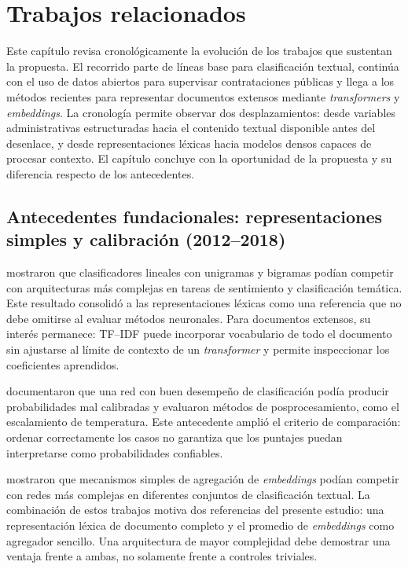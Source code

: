 \clearpage
{}
\chapter{Trabajos relacionados}
\label{sec:trabajos_relacionados}

Este capítulo revisa cronológicamente la evolución de los trabajos que sustentan la propuesta. El recorrido parte de líneas base para clasificación textual, continúa con el uso de datos abiertos para supervisar contrataciones públicas y llega a los métodos recientes para representar documentos extensos mediante \textit{transformers} y \textit{embeddings}. La cronología permite observar dos desplazamientos: desde variables administrativas estructuradas hacia el contenido textual disponible antes del desenlace, y desde representaciones léxicas hacia modelos densos capaces de procesar contexto. El capítulo concluye con la oportunidad de la propuesta y su diferencia respecto de los antecedentes.

\section{Antecedentes fundacionales: representaciones simples y calibración (2012--2018)}

\textcite{wang2012baselines} mostraron que clasificadores lineales con unigramas y bigramas podían competir con arquitecturas más complejas en tareas de sentimiento y clasificación temática. Este resultado consolidó a las representaciones léxicas como una referencia que no debe omitirse al evaluar métodos neuronales. Para documentos extensos, su interés permanece: TF--IDF puede incorporar vocabulario de todo el documento sin ajustarse al límite de contexto de un \textit{transformer} y permite inspeccionar los coeficientes aprendidos.

\textcite{guo2017calibration} documentaron que una red con buen desempeño de clasificación podía producir probabilidades mal calibradas y evaluaron métodos de posprocesamiento, como el escalamiento de temperatura. Este antecedente amplió el criterio de comparación: ordenar correctamente los casos no garantiza que los puntajes puedan interpretarse como probabilidades confiables.

\textcite{shen2018swem} mostraron que mecanismos simples de agregación de \textit{embeddings} podían competir con redes más complejas en diferentes conjuntos de clasificación textual. La combinación de estos trabajos motiva dos referencias del presente estudio: una representación léxica de documento completo y el promedio de \textit{embeddings} como agregador sencillo. Una arquitectura de mayor complejidad debe demostrar una ventaja frente a ambas, no solamente frente a controles triviales.

